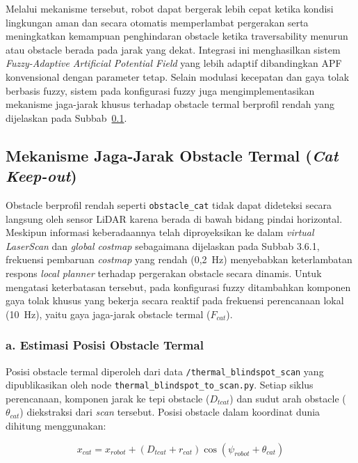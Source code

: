 Melalui mekanisme tersebut, robot dapat bergerak lebih cepat ketika kondisi lingkungan aman dan secara otomatis memperlambat pergerakan serta meningkatkan kemampuan penghindaran obstacle ketika traversability menurun atau obstacle berada pada jarak yang dekat. 
Integrasi ini menghasilkan sistem \textit{Fuzzy-Adaptive Artificial Potential Field} yang lebih adaptif dibandingkan APF konvensional dengan parameter tetap. Selain modulasi kecepatan dan gaya tolak berbasis fuzzy, sistem pada konfigurasi fuzzy juga mengimplementasikan mekanisme jaga-jarak khusus terhadap obstacle termal berprofil rendah yang dijelaskan pada Subbab~\ref{sec:cat_keepout}.

\subsection{Mekanisme Jaga-Jarak Obstacle Termal (\textit{Cat Keep-out})}
\label{sec:cat_keepout}
 
Obstacle berprofil rendah seperti \texttt{obstacle\_cat} tidak dapat
dideteksi secara langsung oleh sensor LiDAR karena berada di bawah
bidang pindai horizontal. Meskipun informasi keberadaannya telah
diproyeksikan ke dalam \textit{virtual LaserScan} dan \textit{global
costmap} sebagaimana dijelaskan pada Subbab 3.6.1, frekuensi
pembaruan \textit{costmap} yang rendah (0,2~Hz) menyebabkan
keterlambatan respons \textit{local planner} terhadap pergerakan
obstacle secara dinamis. Untuk mengatasi keterbatasan tersebut, pada
konfigurasi fuzzy ditambahkan komponen gaya tolak khusus yang bekerja
secara reaktif pada frekuensi perencanaan lokal (10~Hz), yaitu gaya
jaga-jarak obstacle termal ($F_{cat}$).
 
 
\subsubsection*{a. Estimasi Posisi Obstacle Termal}
 
Posisi obstacle termal diperoleh dari data
\texttt{/thermal\_blindspot\_scan} yang dipublikas\-ikan oleh node
\texttt{thermal\_blindspot\_to\_scan.py}. Setiap siklus perencanaan,
komponen jarak ke tepi obstacle ($D_{tcat}$) dan sudut arah obstacle
($\theta_{cat}$) diekstraksi dari \textit{scan} tersebut. Posisi
obstacle dalam koordinat dunia dihitung menggunakan:
 
\begin{equation}
    x_{cat} = x_{robot} + (D_{tcat} + r_{cat})
              \cos(\psi_{robot} + \theta_{cat})
    \label{eq:xcat}
\end{equation}
 
